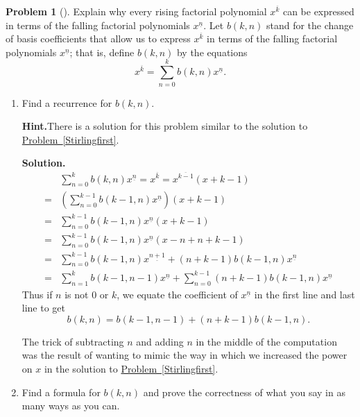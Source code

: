 \documentclass[10pt,]{book}
\theoremstyle{plain}
\theoremstyle{definition}
\newtheorem{activity}[project]{Problem}
\theoremstyle{definition}
\numberwithin{equation}{chapter}
\newcommand{\amp}{&}
\begin{document}
\begin{activity}[]\label{activity-156}
Explain why every rising factorial polynomial \(x^{\overline{k}}\) can be expressed in terms of the falling factorial polynomials \(x^{\underline{n}}\). Let \(b(k,n)\) stand for the change of basis coefficients that allow us to express \(x^{\overline{k}}\) in terms of the falling factorial polynomials \(x^{\underline{n}}\); that is, define \(b(k,n)\) by the equations%
\begin{equation*}
x^{\overline{k}}=\sum_{n=0}^k b(k,n) x^{\underline{n}}.
\end{equation*}
%
\begin{enumerate}[font=\bfseries,label=(\alph*),ref=\alph*]
\item\label{task-109} Find a recurrence for \(b(k,n)\).%
\par\medskip\noindent%
\textbf{Hint.}\quad There is a solution for this problem similar to the solution to \hyperref[Stirlingfirst]{Problem~\ref{Stirlingfirst}}.%
\par\medskip\noindent%
\textbf{Solution.}\quad %
\begin{align*}
\amp \sum_{n=0}^k b(k,n) x^{\underline{n}} = x^{\overline{k}} =
x^{\overline{k-1}}(x+k-1)\\
=\amp \left(\sum_{n=0}^{k-1} b(k-1,n) x^{\underline{n}}\right)(x+k-1)\\
=\amp \sum_{n=0}^{k-1} b(k-1,n) x^{\underline{n}}(x+k-1)\\
=\amp \sum_{n=0}^{k-1} b(k-1,n) x^{\underline{n}}(x-n+n+k-1)\\
=\amp \sum_{n=0}^{k-1} b(k-1,n) x^{\underline{n+1}} +(n+k-1)b(k-1,n)
x^{\underline{n}}\\
=\amp \sum_{n=1}^k b(k-1,n-1)x^{\underline{n}} +\sum_{n=0}^{k-1}
(n+k-1)b(k-1,n)x^{\underline{n}}
\end{align*}
Thus if \(n\) is not 0 or \(k\), we equate the coefficient of \(x^{\underline{n}}\) in the first line and last line to get%
\begin{equation*}
b(k,n) =
b(k-1,n-1) + (n+k-1)b(k-1,n).
\end{equation*}
%
\par
The trick of subtracting \(n\) and adding \(n\) in the middle of the computation was the result of wanting to mimic the way in which we increased the power on \(x\) in the solution to \hyperref[Stirlingfirst]{Problem~\ref{Stirlingfirst}}.%
\item\label{task-110} Find a formula for \(b(k,n)\) and prove the correctness of what you say in as many ways as you can.%

\end{enumerate}
\end{activity}
\end{document}
